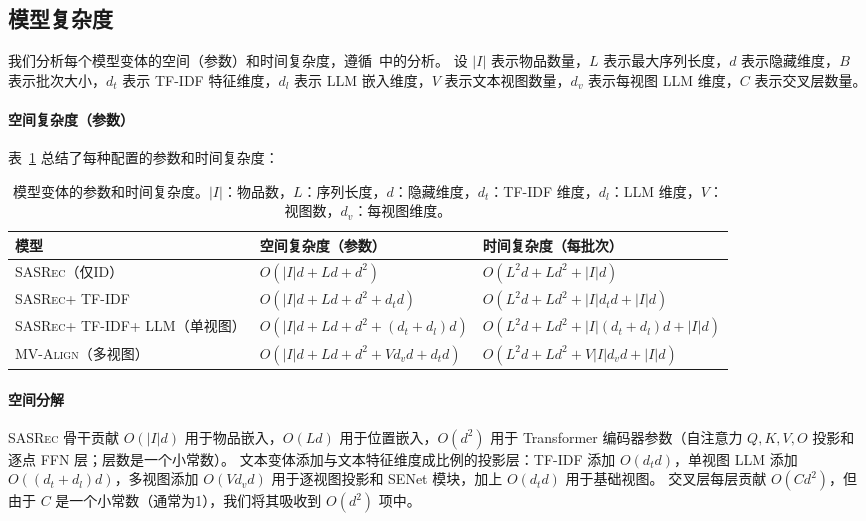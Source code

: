 \documentclass[sigconf,natbib=true]{acmart}
\newcommand{\model}{\textsc{MV-Align}\xspace}
\newcommand{\base}{\textsc{SASRec}\xspace}
\newcommand{\tfidf}{\textsc{TF-IDF}\xspace}
\newcommand{\llm}{\textsc{LLM}\xspace}
\begin{document}
\subsection{模型复杂度}
我们分析每个模型变体的空间（参数）和时间复杂度，遵循~\cite{kang2018sasrec}中的分析。
设 $|I|$ 表示物品数量，$L$ 表示最大序列长度，$d$ 表示隐藏维度，$B$ 表示批次大小，$d_t$ 表示 \tfidf 特征维度，$d_l$ 表示 \llm 嵌入维度，$V$ 表示文本视图数量，$d_v$ 表示每视图 \llm 维度，$C$ 表示交叉层数量。

\paragraph{空间复杂度（参数）}
表~\ref{tab:complexity} 总结了每种配置的参数和时间复杂度：

\begin{table}[t]
\caption{模型变体的参数和时间复杂度。$|I|$：物品数，$L$：序列长度，$d$：隐藏维度，$d_t$：\tfidf 维度，$d_l$：\llm 维度，$V$：视图数，$d_v$：每视图维度。}
\label{tab:complexity}
\centering
\small
\begin{tabular}{lll}
\toprule
\textbf{模型} & \textbf{空间复杂度（参数）} & \textbf{时间复杂度（每批次）} \\
\midrule
\base（仅ID） & $O(|I|d + Ld + d^2)$ & $O(L^2d + Ld^2 + |I|d)$ \\
\base + \tfidf & $O(|I|d + Ld + d^2 + d_t d)$ & $O(L^2d + Ld^2 + |I|d_t d + |I|d)$ \\
\base + \tfidf + \llm（单视图） & $O(|I|d + Ld + d^2 + (d_t{+}d_l)d)$ & $O(L^2d + Ld^2 + |I|(d_t{+}d_l)d + |I|d)$ \\
\model（多视图） & $O(|I|d + Ld + d^2 + Vd_v d + d_t d)$ & $O(L^2d + Ld^2 + V|I|d_v d + |I|d)$ \\
\bottomrule
\end{tabular}
\end{table}

\paragraph{空间分解}
\base 骨干贡献 $O(|I|d)$ 用于物品嵌入，$O(Ld)$ 用于位置嵌入，$O(d^2)$ 用于 Transformer 编码器参数（自注意力 $Q,K,V,O$ 投影和逐点 FFN 层；层数是一个小常数）。
文本变体添加与文本特征维度成比例的投影层：\tfidf 添加 $O(d_t d)$，单视图 \llm 添加 $O((d_t + d_l)d)$，多视图添加 $O(V d_v d)$ 用于逐视图投影和 SENet 模块，加上 $O(d_t d)$ 用于基础视图。
交叉层每层贡献 $O(Cd^2)$，但由于 $C$ 是一个小常数（通常为1），我们将其吸收到 $O(d^2)$ 项中。
\end{document}
